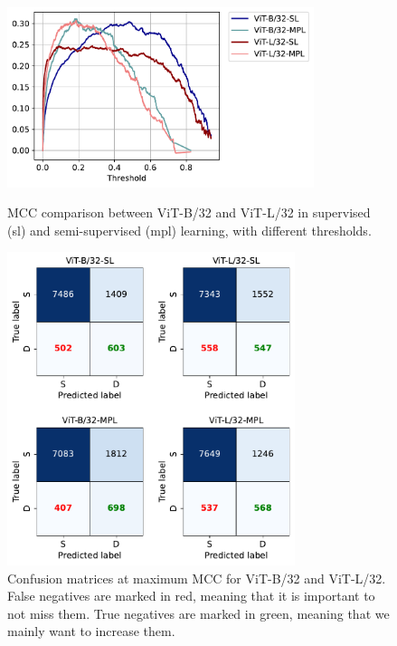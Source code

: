 \begin{figure}[p]
    \centering
    \includegraphics[width=0.8\textwidth]{images/bdd100k/training/mcc_comp.pdf}
    \caption[MCC comparison between ViT-B/32 and ViT-L/32]
    {MCC comparison between ViT-B/32 and ViT-L/32 in supervised (\acs{sl}) and semi-supervised 
    (\acs{mpl}) learning, with different thresholds.}
    \label{fig:mcc}
    \vspace{1cm}
    \includegraphics[width=0.75\textwidth]{images/bdd100k/training/confusion-matrix_comp.pdf}
    \caption[Confusion matrices at maximum MCC]
    {Confusion matrices at maximum MCC for ViT-B/32 and ViT-L/32.
    False negatives are marked in red, meaning that it is important to not miss 
    them. True negatives are marked in green, meaning that we mainly want to 
    increase them.}
    \label{fig:confusion_matrix_max_mcc}
\end{figure}

